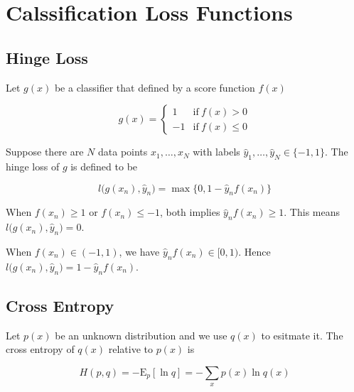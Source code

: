 \documentclass{article}
\begin{document}
    \section*{Calssification Loss Functions}

        \subsection*{Hinge Loss}

            Let $ g(x) $ be a classifier that defined by a score function $ f(x) $

            \begin{equation*}
                g(x) = \left\{ 
                         \begin{array}{rl}
                            1 & \mathrm{if~} f(x) > 0\\
                            -1 & \mathrm{if~} f(x) \leq 0
                         \end{array}
                       \right.
            \end{equation*}

            Suppose there are $ N $ data points $ x_1, \dots, x_N $ with labels
            $ \hat{y}_1,\dots,\hat{y}_N \in \{ -1, 1 \} $. The hinge loss of $ g $
            is defined to be

            \begin{equation*}
                l\big( g(x_n),\hat{y}_n \big) = \max\{ 0, 1 - \hat{y}_n f(x_n) \}
            \end{equation*}

            When $ f(x_n) \geq 1 $ or $ f(x_n) \leq -1 $, both implies $ \hat{y}_n
            f(x_n) \geq 1 $. This means $ l\big( g(x_n), \hat{y}_n \big) = 0 $.

            When $ f(x_n) \in (-1, 1) $, we have $ \hat{y}_n f(x_n)\in [0, 1) $.
            Hence $ l\big( g(x_n), \hat{y}_n \big) = 1 - \hat{y}_n f(x_n) $.

        \subsection*{Cross Entropy}

            Let $ p(x) $ be an unknown distribution and we use $ q(x) $ to esitmate
            it. The cross entropy of $ q(x) $ relative to $ p(x) $ is

            \begin{equation*}
                H(p,q) = -\mathrm{E}_p[\ln q] = - \sum_x p(x) \ln q(x) 
            \end{equation*}
\end{document}

